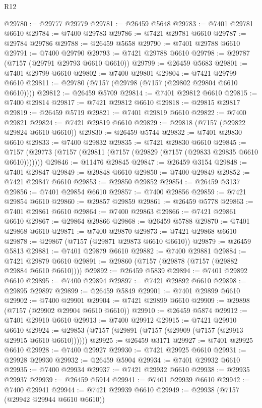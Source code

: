 \begin{lexlean}{R12}
\begin{coremodule}
@29780 := @29777 @29779
@29781 := @26459 @5648
@29783 := @7401 @29781 @6610
@29784 := @7400 @29783
@29786 := @7421 @29781 @6610
@29787 := @29784 @29786
@29788 := @26459 @5658
@29790 := @7401 @29788 @6610
@29791 := @7400 @29790
@29793 := @7421 @29788 @6610
@29798 := @29787 (@7157 (@29791 @29793 @6610 @6610))
@29799 := @26459 @5683
@29801 := @7401 @29799 @6610
@29802 := @7400 @29801
@29804 := @7421 @29799 @6610
@29811 := @29780 (@7157 (@29798 (@7157 (@29802 @29804 @6610 @6610))))
@29812 := @26459 @5709
@29814 := @7401 @29812 @6610
@29815 := @7400 @29814
@29817 := @7421 @29812 @6610
@29818 := @29815 @29817
@29819 := @26459 @5719
@29821 := @7401 @29819 @6610
@29822 := @7400 @29821
@29824 := @7421 @29819 @6610
@29829 := @29818 (@7157 (@29822 @29824 @6610 @6610))
@29830 := @26459 @5744
@29832 := @7401 @29830 @6610
@29833 := @7400 @29832
@29835 := @7421 @29830 @6610
@29845 := @7157 (@29773 (@7157 (@29811 (@7157 (@29829 (@7157 (@29833 @29835 @6610 @6610)))))))
@29846 := @11476 @29845
@29847 := @26459 @3154
@29848 := @7401 @29847
@29849 := @29848 @6610
@29850 := @7400 @29849
@29852 := @7421 @29847 @6610
@29853 := @29850 @29852
@29854 := @26459 @3137
@29856 := @7401 @29854 @6610
@29857 := @7400 @29856
@29859 := @7421 @29854 @6610
@29860 := @29857 @29859
@29861 := @26459 @5778
@29863 := @7401 @29861 @6610
@29864 := @7400 @29863
@29866 := @7421 @29861 @6610
@29867 := @29864 @29866
@29868 := @26459 @5788
@29870 := @7401 @29868 @6610
@29871 := @7400 @29870
@29873 := @7421 @29868 @6610
@29878 := @29867 (@7157 (@29871 @29873 @6610 @6610))
@29879 := @26459 @5813
@29881 := @7401 @29879 @6610
@29882 := @7400 @29881
@29884 := @7421 @29879 @6610
@29891 := @29860 (@7157 (@29878 (@7157 (@29882 @29884 @6610 @6610))))
@29892 := @26459 @5839
@29894 := @7401 @29892 @6610
@29895 := @7400 @29894
@29897 := @7421 @29892 @6610
@29898 := @29895 @29897
@29899 := @26459 @5849
@29901 := @7401 @29899 @6610
@29902 := @7400 @29901
@29904 := @7421 @29899 @6610
@29909 := @29898 (@7157 (@29902 @29904 @6610 @6610))
@29910 := @26459 @5874
@29912 := @7401 @29910 @6610
@29913 := @7400 @29912
@29915 := @7421 @29910 @6610
@29924 := @29853 (@7157 (@29891 (@7157 (@29909 (@7157 (@29913 @29915 @6610 @6610))))))
@29925 := @26459 @3171
@29927 := @7401 @29925 @6610
@29928 := @7400 @29927
@29930 := @7421 @29925 @6610
@29931 := @29928 @29930
@29932 := @26459 @5904
@29934 := @7401 @29932 @6610
@29935 := @7400 @29934
@29937 := @7421 @29932 @6610
@29938 := @29935 @29937
@29939 := @26459 @5914
@29941 := @7401 @29939 @6610
@29942 := @7400 @29941
@29944 := @7421 @29939 @6610
@29949 := @29938 (@7157 (@29942 @29944 @6610 @6610))

\end{coremodule}
\end{lexlean}
